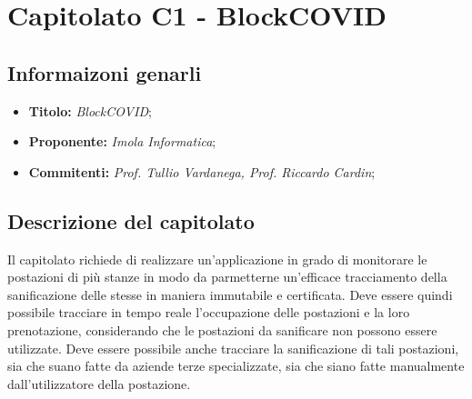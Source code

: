 \section{Capitolato C1 - BlockCOVID}

\subsection{Informaizoni genarli}
\begin{itemize}
    \item \textbf{Titolo:} \textit{BlockCOVID};
    \item \textbf{Proponente:} \textit{Imola Informatica};
    \item \textbf{Commitenti:} \textit{Prof. Tullio Vardanega, Prof. Riccardo Cardin};
\end{itemize}

\subsection{Descrizione del capitolato}
Il capitolato richiede di realizzare un'applicazione in grado di monitorare le postazioni di più stanze in modo da parmetterne un'efficace tracciamento della sanificazione delle stesse in maniera immutabile e certificata.
Deve essere quindi possibile tracciare in tempo reale l'occupazione delle postazioni e la loro prenotazione, considerando che le postazioni da sanificare non possono essere utilizzate.
Deve essere possibile anche tracciare la sanificazione di tali postazioni, sia che suano fatte da aziende terze specializzate, sia che siano fatte manualmente dall'utilizzatore della postazione.


